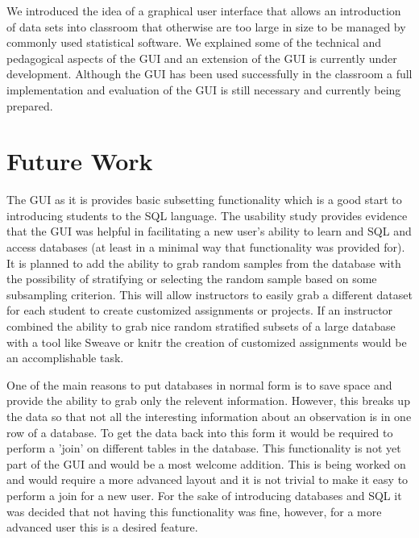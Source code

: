 \documentclass[11pt]{tise_style}
\begin{document}
We introduced the idea of a graphical user interface that allows an introduction of data sets into classroom that otherwise are too large in size to be managed by commonly used statistical software. We explained some of the technical and pedagogical aspects of the GUI and an extension of the GUI is currently under development. Although the GUI has been used successfully in the classroom a full implementation and evaluation of the GUI is still necessary and currently being prepared.

\section{{Future Work}}

The GUI as it is provides basic subsetting functionality which is a good start to introducing students to the SQL language.  The usability study provides evidence that the GUI was helpful in facilitating a new user's ability to learn and SQL and access databases (at least in a minimal way that functionality was provided for).  It is planned to add the ability to grab random samples from the database with the possibility of stratifying or selecting the random sample based on some subsampling criterion.  This will allow instructors to easily grab a different dataset for each student to create customized assignments or projects.  If an instructor combined the ability to grab nice random stratified subsets of a large database with a tool like Sweave or knitr \citet{knitr} the creation of customized assignments would be an accomplishable task.

One of the main reasons to put databases in normal form \citet{normalform:1983} is to save space and provide the ability to grab only the relevent information.  However, this breaks up the data so that not all the interesting information about an observation is in one row of a database.  To get the data back into this form it would be required to perform a 'join' on different tables in the database.  This functionality is not yet part of the GUI and would be a most welcome addition.  This is being worked on and would require a more advanced layout and it is not trivial to make it easy to perform a join for a new user.  For the sake of introducing databases and SQL it was decided that not having this functionality was fine, however, for a more advanced user this is a desired feature.


\end{document}
